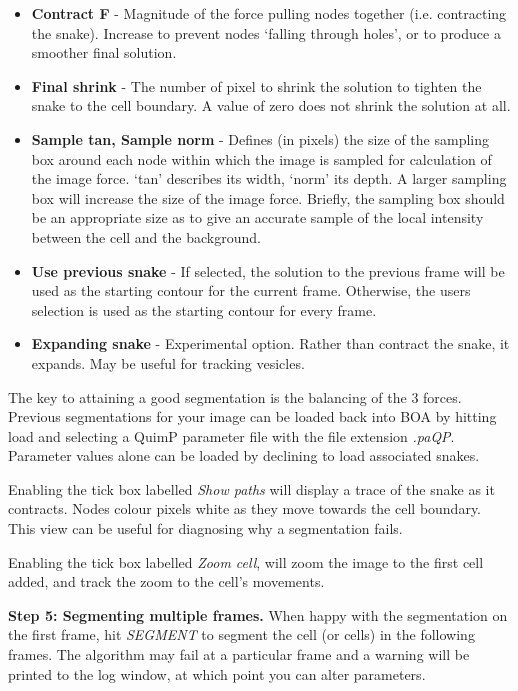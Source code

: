 \documentclass[a4paper,12pt]{article}
\begin{document}
\begin{itemize}
\item \textbf{Contract F} - Magnitude of the force pulling nodes together (i.e. contracting the snake).  Increase to prevent nodes `falling
through holes', or to produce a smoother final solution.
\item \textbf{Final shrink} - The number of pixel to shrink the solution to tighten the snake to the cell boundary.  A value of zero does
not shrink the solution at all.
\item \textbf{Sample tan, Sample norm} - Defines (in pixels) the size of the sampling box around each node within which the 
image is sampled for calculation of the image force.  `tan' describes its width, `norm' its depth.  A larger sampling box will increase 
the size of the image force.  Briefly, the sampling box should be an appropriate size as to give an accurate sample of the local
 intensity between the cell and the background.
\item \textbf{Use previous snake} - If selected, the solution to the previous frame will be used as the starting contour for the current frame.
Otherwise, the users selection is used as the starting contour for every frame.
\item \textbf{Expanding snake} - Experimental option. Rather than contract the snake, it expands.  May be useful for tracking vesicles.
\end{itemize}

The key to attaining a good segmentation is the balancing of the 3 forces. Previous segmentations for your image can be loaded
back into BOA by hitting load and selecting a QuimP parameter file with the file extension \textit{.paQP}.
Parameter values alone can be loaded by declining to load associated snakes.

Enabling the tick box labelled \textit{Show paths} will display a trace of the snake as it contracts.  Nodes colour pixels white as they
move towards the cell boundary.  This view can be useful for diagnosing why a segmentation fails.

Enabling the tick box labelled \textit{Zoom cell}, will zoom the image to the first cell added, and track the zoom to 
the cell's movements.


\textbf{Step 5: Segmenting multiple frames.}  When happy with the segmentation on the first frame, hit \textit{SEGMENT} to segment
the cell (or cells) in the following frames.  The algorithm may fail at a particular frame and a warning will be printed to the log window,
at which point you can alter parameters.
\end{document}
